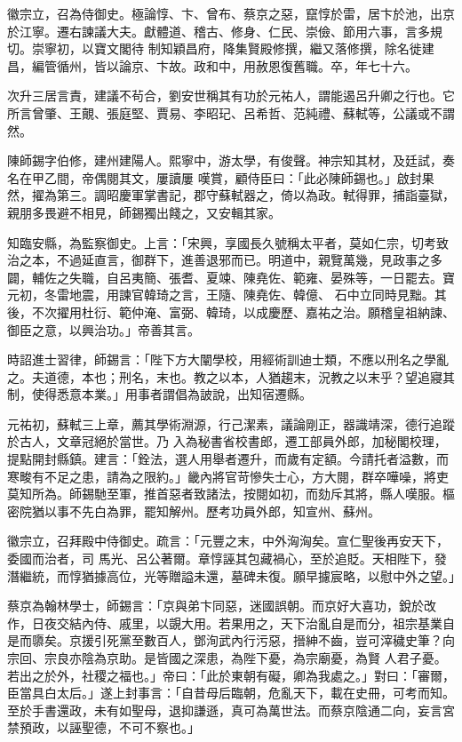 \begin{pinyinscope}
 徽宗立，召為侍御史。極論惇、卞、曾布、蔡京之惡，竄惇於雷，居卞於池，出京於江寧。遷右諫議大夫。獻體道、稽古、修身、仁民、崇儉、節用六事，言多規切。崇寧初，以寶文閣待
 制知穎昌府，降集賢殿修撰，繼又落修撰，除名徙建昌，編管循州，皆以論京、卞故。政和中，用赦恩復舊職。卒，年七十六。



 次升三居言責，建議不茍合，劉安世稱其有功於元祐人，謂能遏呂升卿之行也。它所言曾肇、王覿、張庭堅、賈易、李昭玘、呂希哲、范純禮、蘇軾等，公議或不謂然。



 陳師錫字伯修，建州建陽人。熙寧中，游太學，有俊聲。神宗知其材，及廷試，奏名在甲乙間，帝偶閱其文，屢讀屢
 嘆賞，顧侍臣曰：「此必陳師錫也。」啟封果然，擢為第三。調昭慶軍掌書記，郡守蘇軾器之，倚以為政。軾得罪，捕詣臺獄，親朋多畏避不相見，師錫獨出餞之，又安輯其家。



 知臨安縣，為監察御史。上言：「宋興，享國長久號稱太平者，莫如仁宗，切考致治之本，不過延直言，御群下，進善退邪而已。明道中，親覽萬幾，見政事之多闢，輔佐之失職，自呂夷簡、張耆、夏竦、陳堯佐、範雍、晏殊等，一日罷去。寶元初，冬雷地震，用諫官韓琦之言，王隨、陳堯佐、韓億、
 石中立同時見黜。其後，不次擢用杜衍、範仲淹、富弼、韓琦，以成慶歷、嘉祐之治。願稽皇祖納諫、御臣之意，以興治功。」帝善其言。



 時詔進士習律，師錫言：「陛下方大闡學校，用經術訓迪士類，不應以刑名之學亂之。夫道德，本也；刑名，末也。教之以本，人猶趨末，況教之以末乎？望追寢其制，使得悉意本業。」用事者謂倡為詖說，出知宿遷縣。



 元祐初，蘇軾三上章，薦其學術淵源，行己潔素，議論剛正，器識靖深，德行追蹤於古人，文章冠絕於當世。乃
 入為秘書省校書郎，遷工部員外郎，加秘閣校理，提點開封縣鎮。建言：「銓法，選人用舉者遷升，而歲有定額。今請托者溢數，而寒畯有不足之患，請為之限約。」畿內將官苛慘失士心，方大閱，群卒嘩噪，將吏莫知所為。師錫馳至軍，推首惡者致諸法，按閱如初，而劾斥其將，縣人嘆服。樞密院猶以事不先白為罪，罷知解州。歷考功員外郎，知宣州、蘇州。



 徽宗立，召拜殿中侍御史。疏言：「元豐之末，中外洶洶矣。宣仁聖後再安天下，委國而治者，司
 馬光、呂公著爾。章惇誣其包藏禍心，至於追貶。天相陛下，發潛繼統，而惇猶據高位，光等贈謚未還，墓碑未復。願早攄宸略，以慰中外之望。」



 蔡京為翰林學士，師錫言：「京與弟卞同惡，迷國誤朝。而京好大喜功，銳於改作，日夜交結內侍、戚里，以覬大用。若果用之，天下治亂自是而分，祖宗基業自是而隳矣。京援引死黨至數百人，鄧洵武內行污惡，搢紳不齒，豈可滓穢史筆？向宗回、宗良亦陰為京助。是皆國之深患，為陛下憂，為宗廟憂，為賢
 人君子憂。若出之於外，社稷之福也。」帝曰：「此於東朝有礙，卿為我處之。」對曰：「審爾，臣當具白太后。」遂上封事言：「自昔母后臨朝，危亂天下，載在史冊，可考而知。至於手書還政，未有如聖母，退抑謙遜，真可為萬世法。而蔡京陰通二向，妄言宮禁預政，以誣聖德，不可不察也。」




\end{pinyinscope}
